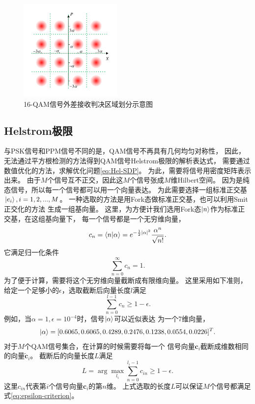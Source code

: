 \begin{figure}
\centering
  \includegraphics[height=5cm]{figures/chap3/QAM-domain-split}
  \caption{16-QAM信号外差接收判决区域划分示意图}
  \label{fig:QAM-domain-split}
\end{figure}

\subsection{Helstrom极限}
与PSK信号和PPM信号不同的是，QAM信号不再具有几何均匀对称性，
因此，无法通过平方根检测的方法得到QAM信号Helstrom极限的解析表达式，
需要通过数值优化的方法，求解优化问题\ref{eq:Hel-SDP}。
为此，需要将信号用密度矩阵表示出来。
由于$M$个信号互不正交，因此这$M$个信号张成$M$维Hilbert空间。
因为是纯态信号，所以每一个信号都可以用一个向量表达。
为此需要选择一组标准正交基$\ket{e_i}, i=1,2,...,M$。
一种选取的方法是用Fork态做标准正交基，也可以利用Smit正交化的方法
生成一组基向量\cite{zxd2004matrix}。
这里，为方便计我们选用Fork态$\ket{n}$作为标准正交基，在这组基向量下，
每一个信号都是一个无穷维向量，
\begin{equation}
c_n = \bra{n}\ket{\alpha} = e^{-\frac{1}{2}|\alpha|^2} \frac{\alpha^n}{\sqrt{n!}}.
\end{equation}
它满足归一化条件
\begin{equation}
\sum_{n=0}^{\infty} c_n = 1.
\end{equation}
为了便于计算，需要将这个无穷维向量截断成有限维向量。
这里采用如下准则，给定一个足够小的$\epsilon$，选取截断后向量长度$l$满足
\begin{equation}
\sum_{n=0}^{l-1} c_n \ge 1 - \epsilon.
\label{eq:epsilon-criterion}
\end{equation}
例如，当$\alpha=1, \epsilon=10^{-4}$时，信号$\ket{\alpha}$可以近似表达
为一个7维向量，
\begin{equation}
\ket{\alpha} = [0.6065, \\
    0.6065, \\
    0.4289, \\
    0.2476, \\
    0.1238, \\
    0.0554, \\
    0.0226]^T.
\end{equation}
对于$M$个QAM信号集合，在计算的时候需要将每一个
信号向量$\bm{c}_i$截断成维数相同的向量$\tilde{\bm{c}}_i$。
截断后的向量长度$L$满足
\begin{equation}
L = \arg\max_{l_i} \sum_{n=0}^{l_i-1} c_{in} \ge 1 - \epsilon.
\end{equation}
这里$c_{in}$代表第$i$个信号向量$\bm{c}_i$的第$n$维。
上式选取的长度$L$可以保证$M$个信号都满足式\ref{eq:epsilon-criterion}。

